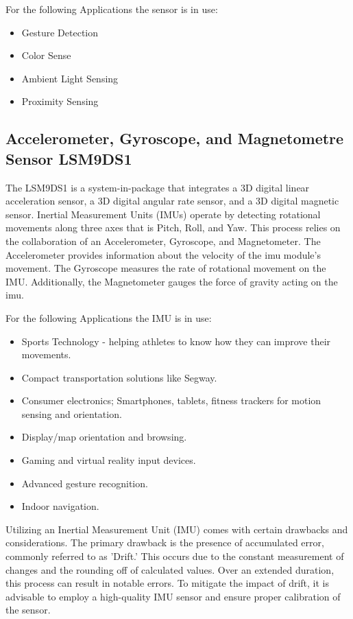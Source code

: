 For the following Applications the sensor is in use:

\begin{itemize}
	\item Gesture Detection
	\item Color Sense
	\item Ambient Light Sensing
	\item Proximity Sensing
\end{itemize}

\subsection{Accelerometer, Gyroscope, and Magnetometre Sensor
	LSM9DS1}

The LSM9DS1 is a system-in-package that integrates a 3D digital linear acceleration sensor, a 3D digital angular rate sensor, and a 3D digital magnetic sensor. Inertial Measurement Units (IMUs) operate by detecting rotational movements along three axes that is Pitch, Roll, and Yaw. This process relies on the collaboration of an Accelerometer, Gyroscope, and Magnetometer. The Accelerometer provides information about the velocity of the \ac{imu} module's movement. The Gyroscope measures the rate of rotational movement on the IMU. Additionally, the Magnetometer gauges the force of gravity acting on the \ac{imu}.

For the following Applications the IMU is in use:

\begin{itemize}
	\item Sports Technology - helping athletes to know how they can improve their
	movements.
	\item Compact transportation solutions like Segway.
	\item Consumer electronics; Smartphones, tablets, fitness trackers for motion sensing
	and orientation.
	\item Display/map orientation and browsing.
	\item Gaming and virtual reality input devices.
	\item Advanced gesture recognition.
	\item Indoor navigation.
\end{itemize}

Utilizing an Inertial Measurement Unit (IMU) comes with certain drawbacks and considerations. The primary drawback is the presence of accumulated error, commonly referred to as 'Drift.' This occurs due to the constant measurement of changes and the rounding off of calculated values. Over an extended duration, this process can result in notable errors. To mitigate the impact of drift, it is advisable to employ a high-quality IMU sensor and ensure proper calibration of the sensor.\cite{LSM9DS1:2015}


